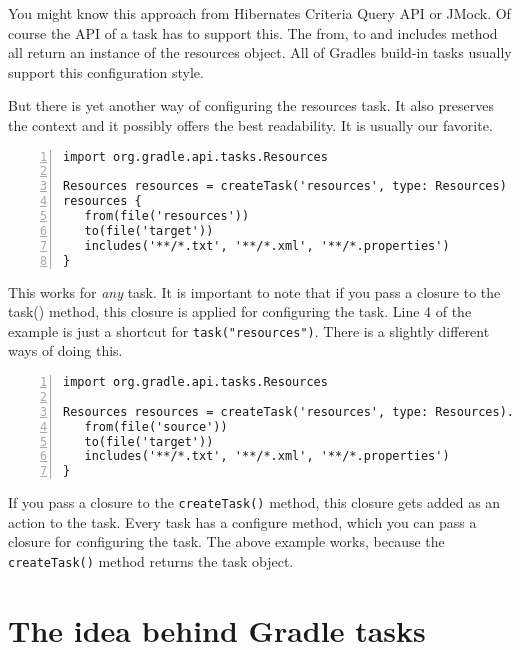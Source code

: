 You might know this approach from Hibernates Criteria Query API or JMock. Of course the API of a task has to support this. The from, to and includes method all return an instance of the resources object. All of Gradles build-in tasks usually support this configuration style.

But there is yet another way of configuring the resources task. It also preserves the context and it possibly offers the best readability. It is usually our favorite.

\begin{Verbatim}[numbers=left]
import org.gradle.api.tasks.Resources

Resources resources = createTask('resources', type: Resources)
resources {
   from(file('resources'))
   to(file('target'))
   includes('**/*.txt', '**/*.xml', '**/*.properties')
}
\end{Verbatim}

This works for \emph{any} task. It is important to note that if you pass a closure to the task() method, this closure is applied for configuring the task. Line 4 of the example is just a shortcut for \texttt{task("resources")}. There is a slightly different ways of doing this.

\begin{Verbatim}[numbers=left]
import org.gradle.api.tasks.Resources

Resources resources = createTask('resources', type: Resources).configure {
   from(file('source'))
   to(file('target'))
   includes('**/*.txt', '**/*.xml', '**/*.properties')
}	
\end{Verbatim}

If you pass a closure to the \texttt{createTask()} method, this closure gets added as an action to the task. Every task has a configure method, which you can pass a closure for configuring the task. The above example works, because the \texttt{createTask()} method returns the task object.

\section{The idea behind Gradle tasks} %
\label{sec:the_idea_behind_gradle_tasks}

